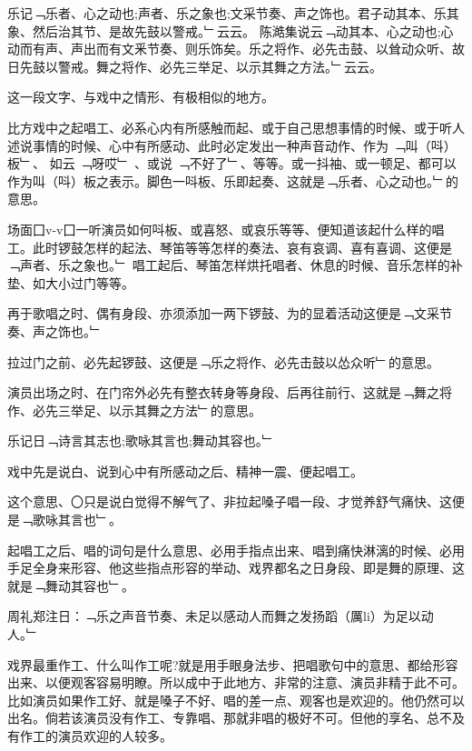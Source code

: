 \documentclass{zhvt-classic}
\begin{document}
\begin{preface}
  乐记﹁乐者、心之动也;声者、乐之象也;文采节奏、声之饰也。君子动其本、乐其象、然后治其节、是故先鼓以警戒。﹂云云。
  陈澔集说云﹁动其本、心之动也;心动而有声、声出而有文釆节奏、则乐饰矣。乐之将作、必先击鼓、以耸动众听、故日先鼓以警戒。舞之将作、必先三举足、以示其舞之方法。﹂云云。
\end{preface}

这一段文字、与戏中之情形、有极相似的地方。

比方戏中之起唱工、必系心内有所感触而起、或于自己思想事情的时候、或于听人述说事情的时候、心中有所感动、此时必定发出一种声音动作、作为 ﹁叫（呌）板﹂、 如云 ﹁呀哎﹂ 、或说 ﹁不好了﹂、等等。或一抖袖、或一顿足、都可以作为叫（呌）板之表示。脚色一呌板、乐即起奏、这就是﹁乐者、心之动也。﹂的意思。

场面囗v-v囗一听演员如何呌板、或喜怒、或哀乐等等、便知道该起什么样的唱工。此时锣鼓怎样的起法、琴笛等等怎样的奏法、哀有哀调、喜有喜调、这便是﹁声者、乐之象也。﹂ 唱工起后、琴笛怎样烘托唱者、休息的时候、音乐怎样的补垫、如大小过门等等。

再于歌唱之时、偶有身段、亦须添加一两下锣鼓、为的显着活动这便是﹁文采节奏、声之饰也。﹂

拉过门之前、必先起锣鼓、这便是﹁乐之将作、必先击鼓以怂众听﹂的意思。

演员出场之时、在门帘外必先有整衣转身等身段、后再往前行、这就是﹁舞之将作、必先三举足、以示其舞之方法﹂的意思。

\begin{preface}
  乐记日﹁诗言其志也;歌咏其言也;舞动其容也。﹂
\end{preface}

戏中先是说白、说到心中有所感动之后、精神一震、便起唱工。

这个意思、〇只是说白觉得不解气了、非拉起嗓子唱一段、才觉养舒气痛快、这便是﹁歌咏其言也﹂。

起唱工之后、唱的词句是什么意思、必用手指点出来、唱到痛快淋漓的时候、必用手足全身来形容、他这些指点形容的举动、戏界都名之日身段、即是舞的原理、这就是﹁舞动其容也﹂。

\begin{preface}
  周礼郑注日：﹁乐之声音节奏、未足以感动人而舞之发扬蹈（厲li）为足以动人。﹂
\end{preface}

戏界最重作工、什么叫作工呢?就是用手眼身法步、把唱歌句中的意思、都给形容出来、以便观客容易明瞭。所以成中于此地方、非常的注意、演员非精于此不可。比如演员如果作工好、就是嗓子不好、唱的差一点、观客也是欢迎的。他仍然可以出名。倘若该演员没有作工、专靠唱、那就非唱的极好不可。但他的享名、总不及有作工的演员欢迎的人较多。
\end{document}

